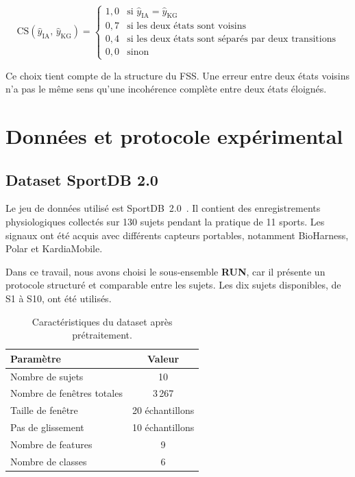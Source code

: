 \documentclass[12pt,a4paper]{article}
\begin{document}
\begin{equation}
\text{CS}(\hat{y}_{\text{IA}},\,\hat{y}_{\text{KG}}) =
\begin{cases}
1{,}0 & \text{si } \hat{y}_{\text{IA}} = \hat{y}_{\text{KG}} \\
0{,}7 & \text{si les deux états sont voisins} \\
0{,}4 & \text{si les deux états sont séparés par deux transitions} \\
0{,}0 & \text{sinon}
\end{cases}
\end{equation}

Ce choix tient compte de la structure du FSS. Une erreur entre deux états
voisins n'a pas le même sens qu'une incohérence complète entre deux états
éloignés.


\section{Données et protocole expérimental}
\label{sec:donnees}


\subsection{Dataset SportDB 2.0}

Le jeu de données utilisé est SportDB~2.0~\cite{sportdb2}. Il contient des
enregistrements physiologiques collectés sur 130 sujets pendant la pratique
de 11 sports. Les signaux ont été acquis avec différents capteurs portables,
notamment BioHarness, Polar et KardiaMobile.

Dans ce travail, nous avons choisi le sous-ensemble \textbf{RUN}, car il
présente un protocole structuré et comparable entre les sujets. Les dix
sujets disponibles, de S1 à S10, ont été utilisés.

\begin{table}[H]
\centering
\caption{Caractéristiques du dataset après prétraitement.}
\label{tab:dataset}
\begin{tabular}{lc}
\toprule
\textbf{Paramètre} & \textbf{Valeur} \\
\midrule
Nombre de sujets             & 10 \\
Nombre de fenêtres totales   & 3\,267 \\
Taille de fenêtre            & 20 échantillons \\
Pas de glissement            & 10 échantillons \\
Nombre de features           & 9 \\
Nombre de classes            & 6 \\
\bottomrule
\end{tabular}
\end{table}
\end{document}
